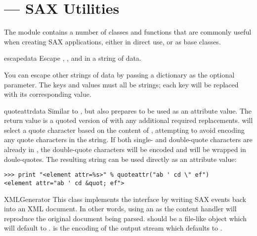 \section{ ---
         SAX Utilities}




The module  contains a number of classes and
functions that are commonly useful when creating SAX applications,
either in direct use, or as base classes.

\begin{funcdesc}{escape}{data}
  Escape \character{\&}, \character{<}, and \character{>} in a string
  of data.

  You can escape other strings of data by passing a dictionary as the
  optional  parameter.  The keys and values must all be
  strings; each key will be replaced with its corresponding value.
\end{funcdesc}

\begin{funcdesc}{quoteattr}{data}
  Similar to , but also prepares  to be
  used as an attribute value.  The return value is a quoted version of
   with any additional required replacements.
   will select a quote character based on the
  content of , attempting to avoid encoding any quote
  characters in the string.  If both single- and double-quote
  characters are already in , the double-quote characters
  will be encoded and  will be wrapped in doule-quotes.  The
  resulting string can be used directly as an attribute value:

\begin{verbatim}
>>> print "<element attr=%s>" % quoteattr("ab ' cd \" ef")
<element attr="ab ' cd &quot; ef">
\end{verbatim}

\end{funcdesc}

\begin{classdesc}{XMLGenerator}{}
  This class implements the  interface by
  writing SAX events back into an XML document. In other words, using
  an  as the content handler will reproduce the
  original document being parsed.  should be a file-like
  object which will default to .  is the
  encoding of the output stream which defaults to .
\end{classdesc}


